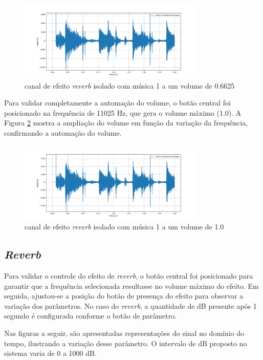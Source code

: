 \begin{figure}[h]
    \centering
    \includegraphics[width=0.8\textwidth]{figuras/fig68.png}
    \caption{canal de efeito \textit{reverb} isolado com música 1 a um volume de 0.6625}
    \label{fig68}
\end{figure}

Para validar completamente a automação do volume, o botão central foi posicionado na frequência de 11025 Hz, que gera o volume máximo (1.0). A Figura \ref{fig69} mostra a ampliação do volume em função da variação da frequência, confirmando a automação do volume.

\begin{figure}[h]
    \centering
    \includegraphics[width=0.8\textwidth]{figuras/fig69.png}
    \caption{canal de efeito \textit{reverb} isolado com música 1 a um volume de 1.0}
    \label{fig69}
\end{figure}

\subsection{\textit{Reverb}}

Para validar o controle do efeito de \textit{reverb}, o botão central foi posicionado para garantir que a frequência selecionada resultasse no volume máximo do efeito. Em seguida, ajustou-se a posição do botão de presença do efeito para observar a variação dos parâmetros. No caso do \textit{reverb}, a quantidade de dB presente após 1 segundo é configurada conforme o botão de parâmetro.

Nas figuras a seguir, são apresentadas representações do sinal no domínio do tempo, ilustrando a variação desse parâmetro. O intervalo de dB proposto no sistema varia de 0 a 1000 dB.

